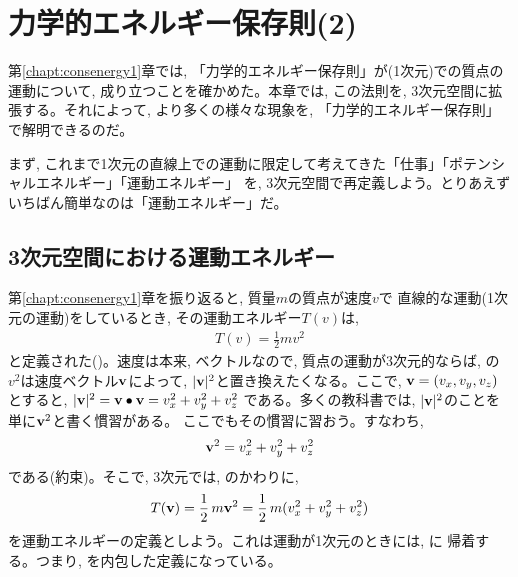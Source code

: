 \chapter{力学的エネルギー保存則(2)}

第\ref{chapt:consenergy1}章では, 「力学的エネルギー保存則」が(1次元)での質点の運動について, 
成り立つことを確かめた。本章では, この法則を, 3次元空間に拡張する。それによって, より多くの様々な現象を, 
「力学的エネルギー保存則」で解明できるのだ。

まず, これまで1次元の直線上での運動に限定して考えてきた「仕事」「ポテンシャルエネルギー」「運動エネルギー」
を, 3次元空間で再定義しよう。とりあえずいちばん簡単なのは「運動エネルギー」だ。\mv

\section{3次元空間における運動エネルギー}

第\ref{chapt:consenergy1}章を振り返ると, 質量$m$の質点が速度$v$で
直線的な運動(1次元の運動)をしているとき, その運動エネルギー$T(v)$は, 
\begin{eqnarray}
T(v)=\frac{1}{2}mv^2\label{eq:kineticEnergy_again}
\end{eqnarray}
と定義された()。速度は本来, ベクトルなので, 
質点の運動が3次元的ならば, の
$v^2$は速度ベクトル${\bf v}$によって, 
$|{\bf v}|^2$と置き換えたくなる。ここで, 
${\bf v}=(v_x, v_y, v_z)$とすると, 
$|{\bf v}|^2={\bf v}\bullet{\bf v}=v_x^2+v_y^2+v_z^2$
である。多くの教科書では, $|{\bf v}|^2$のことを単に${\bf v}^2$と書く慣習がある。
ここでもその慣習に習おう。すなわち, 
\begin{eqnarray} 
{\bf v}^2=v_x^2+v_y^2+v_z^2
\end{eqnarray} 
である(約束)。そこで, 3次元では, のかわりに, 
\begin{eqnarray} 
T({\bf v})=\frac{1}{2}\,m{\bf v}^2=\frac{1}{2}\,m(v_x^2+v_y^2+v_z^2)\label{eq:kineticEnergy3D0}
\end{eqnarray}
を運動エネルギーの定義としよう。これは運動が1次元のときには, に
帰着する。つまり, を内包した定義になっている。\mv



